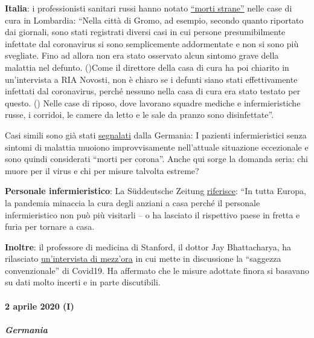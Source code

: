 \textbf{Italia}: i professionisti sanitari russi hanno notato
\href{https://de.sputniknews.com/panorama/20200402326767475-fachpersonal-todesfaelle-lombardei-zeitung/}{``morti
strane''} nelle case di cura in Lombardia: ``Nella città di Gromo, ad
esempio, secondo quanto riportato dai giornali, sono stati registrati
diversi casi in cui persone presumibilmente infettate dal coronavirus si
sono semplicemente addormentate e non si sono più svegliate. Fino ad
allora non era stato osservato alcun sintomo grave della malattia nel
defunto. ()Come il direttore della casa di cura ha poi chiarito in
un'intervista a RIA Novosti, non è chiaro se i defunti siano stati
effettivamente infettati dal coronavirus, perché nessuno nella casa di
cura era stato testato per questo. () Nelle case di riposo, dove
lavorano squadre mediche e infermieristiche russe, i corridoi, le camere
da letto e le sale da pranzo sono disinfettate''.

Casi simili sono già stati
\href{https://web.archive.org/web/20200330082928/https:/www.sueddeutsche.de/panorama/coronavirus-news-deutschland-wolfsburg-laschet-1.4828033}{segnalati}
dalla Germania: I pazienti infermieristici senza sintomi di malattia
muoiono improvvisamente nell'attuale situazione eccezionale e sono
quindi considerati ``morti per corona''. Anche qui sorge la domanda
seria: chi muore per il virus e chi per misure talvolta estreme?

\textbf{Personale infermieristico}: La Süddeutsche Zeitung
\href{https://www.sueddeutsche.de/politik/coronavirus-pflegekraefte-ausland-1.4866124}{riferisce}:
``In tutta Europa, la pandemia minaccia la cura degli anziani a casa
perché il personale infermieristico non può più visitarli -- o ha
lasciato il rispettivo paese in fretta e furia per tornare a casa.

\textbf{Inoltre}: il professore di medicina di Stanford, il dottor Jay
Bhattacharya, ha rilasciato
\href{https://www.youtube.com/watch?v=-UO3Wd5urg0}{un'intervista di
mezz'ora} in cui mette in discussione la ``saggezza convenzionale'' di
Covid19. Ha affermato che le misure adottate finora si basavano su dati
molto incerti e in parte discutibili.

\hypertarget{2-aprile-2020-i}{%
\paragraph{2 aprile 2020 (I)}\label{2-aprile-2020-i}}

\hypertarget{germania}{%
\subparagraph{\texorpdfstring{\textbf{Germania}}{Germania}}\label{germania}}

